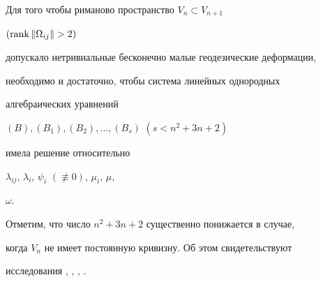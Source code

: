 \begin{thm}


Для того чтобы риманово пространство $V_n\subset V_{n+1}$ 


$(\rank\|\Omega_{ij}\|>2)$


допускало нетривиальные бесконечно малые геодезические деформации,


необходимо и достаточно, чтобы система линейных однородных


алгебраических уравнений


$(B),(B_1),(B_2),\dotsc,(B_s)$ $(s<n^2+3n+2)$


имела решение относительно


$\lambda_{ij}$, $\lambda_i$, $\psi_i$ $(\not\equiv0)$, $\mu_i$, $\mu$,


$\omega$.


\end{thm}





Отметим, что число $n^2+3n+2$ существенно понижается в случае,


когда $V_n$ не имеет постоянную кривизну. Об этом свидетельствуют


исследования \cite{si}, \cite{mige}, \cite{ya}, \cite{mikio}.








